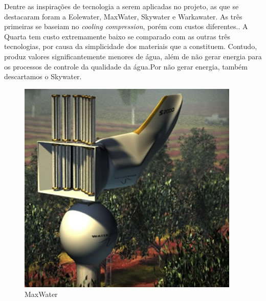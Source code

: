 % 
% 
% 
% 
% 
 
Dentre as inspirações de tecnologia a serem aplicadas no projeto, as que se destacaram foram a Eolewater, MaxWater, Skywater e Warkawater. As três primeiras se baseiam no \emph{cooling compression}, porém com custos diferentes.\cite{eole}\cite{whisson}\cite{island}. A Quarta tem custo extremamente baixo se comparado com as outras três tecnologias, por causa da simplicidade dos materiais que a constituem. Contudo, produz valores significantemente menores de água, além de não gerar energia para os processos de controle da qualidade da água\cite{warkawater3}.Por não gerar energia, também descartamos o Skywater.

\begin{figure}[!ht]
\centering
\includegraphics[scale=0.6]{editaveis/figuras/max_water}
\caption[MaxWater]{MaxWater\footnotemark}

\label{max_water_turbina}
\end{figure}

